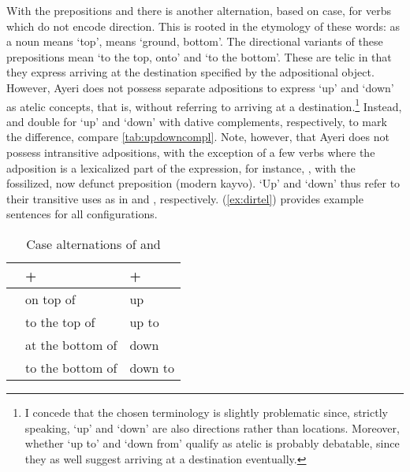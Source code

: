 \xe

With the prepositions  and  there is another alternation, based on case, for verbs which do not
encode direction. This is rooted in the etymology of these words:
 as a noun means `top',  means `ground,
bottom'. The directional variants of these prepositions mean `to the top, onto'
and `to the bottom'. These are telic in that they express arriving
at the destination specified by the adpositional object. However, Ayeri does
not possess separate adpositions to express `up' and `down' as atelic concepts,
that is, without referring to arriving at a destination.\footnote{I concede
that the chosen terminology is slightly problematic since, strictly speaking,
`up' and `down' are also directions rather than locations. Moreover, whether
`up to' and `down from' qualify as atelic is probably debatable, since they as
well suggest arriving at a destination eventually.} Instead,
 and  double for `up' and `down' with dative
complements, respectively, to mark the difference, compare 
\autoref{tab:updowncompl}. Note, however, that Ayeri does not possess
intransitive adpositions, with the exception of a few verbs where the
adposition is a lexicalized part of the expression, for instance,
, with the fossilized, now
defunct preposition  (modern 
{kayvo}). `Up' and `down' thus refer to their transitive uses as in  and , respectively. (\ref{ex:dirtel}) provides
example sentences for all configurations.

\begin{table}\centering
\caption{Case alternations of  and }

\begin{tabu} to \linewidth {X X[c] X[c]}
\toprule\tableheaderfont

%
	& +~\Loc
	& +~\Dat
	\\

\toprule

	& on top of
	& up
	\\


	& to the top of
	& up to
	\\

\midrule

	& at the bottom of
	& down
	\\


	& to the bottom of
	& down to
	\\

\bottomrule
\end{tabu}

\label{tab:updowncompl}
\end{table}

